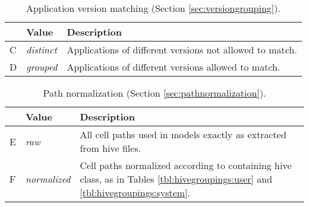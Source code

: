 \documentclass[11pt]{ucthesis}
\theoremstyle{plain}
\theoremstyle{definition}
\begin{document}
\begin{table}[htp]
\begin{small}
\caption{\label{tbl:paramenum:versiongrouping}Application version matching (Section \ref{sec:versiongrouping}).}
\begin{center}
\begin{tabular}{llp{4in}}
\toprule
 & Value & Description \\
\midrule
C & \emph{distinct} & Applications of different versions not allowed to match. \\
D & \emph{grouped} & Applications of different versions allowed to match. \\
\bottomrule
\end{tabular}
\end{center}
\end{small}
\end{table}

\begin{table}[htp]
\begin{small}
\caption{\label{tbl:paramenum:paths}Path normalization (Section \ref{sec:pathnormalization}).}
\begin{center}
\begin{tabular}{llp{4in}}
\toprule
 & Value & Description \\
\midrule
E & \emph{raw} & All cell paths used in models exactly as extracted from hive files. \\
F & \emph{normalized} & Cell paths normalized according to containing hive class, as in Tables \ref{tbl:hivegroupings:user} and \ref{tbl:hivegroupings:system}. \\
\bottomrule
\end{tabular}
\end{center}
\end{small}
\end{table}
\end{document}
